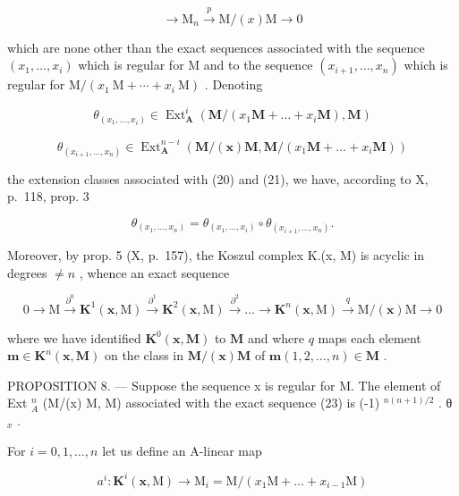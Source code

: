 \[
\longrightarrow \mathrm{M} _ {n} \stackrel {p} {\longrightarrow} \mathrm{M} / (x) \mathrm{M} \longrightarrow 0
\]

which are none other than the exact sequences associated with the sequence \((x_{1}, \ldots, x_{i})\) which is regular for M and to the sequence \((x_{i+1}, \ldots, x_{n})\) which is regular for \(\mathrm{M}/(x_{1} \mathrm{~M} + \cdots + x_{i} \mathrm{~M})\) . Denoting

\[
\theta_ {(x _ {1}, \dots , x _ {i})} \in \operatorname{Ext} _ {\mathbf {A}} ^ {i} (\mathbf {M} / (x _ {1} \mathbf {M} + \dots + x _ {i} \mathbf {M}), \mathbf {M})
\]

\[
\theta_ {(x _ {i + 1}, \dots , x _ {n})} \in \operatorname{Ext} _ {\mathbf {A}} ^ {n - i} (\mathbf {M} / (\boldsymbol {x}) \mathbf {M}, \mathbf {M} / (x _ {1} \mathbf {M} + \dots + x _ {i} \mathbf {M}))
\]

the extension classes associated with (20) and (21), we have, according to X, p.~118, prop. 3

\[
\theta_ {(x _ {1}, \dots , x _ {n})} = \theta_ {(x _ {1}, \dots , x _ {i})} \circ \theta_ {(x _ {i + 1}, \dots , x _ {n})}.\tag{22}
\]

Moreover, by prop. 5 (X, p.~157), the Koszul complex K.(x, M) is acyclic in degrees \(\neq n\) , whence an exact sequence

\[
0 \longrightarrow \mathrm{M} \xrightarrow {\partial^ {0}} \mathbf {K} ^ {1} (\boldsymbol {x}, \mathrm{M}) \xrightarrow {\partial^ {1}} \mathbf {K} ^ {2} (\boldsymbol {x}, \mathrm{M}) \xrightarrow {\partial^ {2}} \dots \longrightarrow \mathbf {K} ^ {n} (\boldsymbol {x}, \mathrm{M}) \xrightarrow {q} \mathrm{M} / (\boldsymbol {x}) \mathrm{M} \longrightarrow 0\tag{23}
\]

where we have identified \(\mathbf{K}^{0}(\boldsymbol{x},\mathbf{M})\) to \(\mathbf{M}\) and where \(q\) maps each element \(\boldsymbol{m}\in\mathbf{K}^{n}(\boldsymbol{x},\mathbf{M})\) on the class in \(\mathbf{M}/(\boldsymbol{x})\mathbf{M}\) of \(\boldsymbol{m}(1,2,\ldots,n)\in\mathbf{M}\) .

PROPOSITION 8. --- Suppose the sequence x is regular for M. The element of Ext \(_{A}^{n}\) (M/(x) M, M) associated with the exact sequence (23) is (-1) \(^{n(n+1)/2}\) . θ \(_{x}\) .

For \(i = 0,1,\dots,n\) let us define an A-linear map

\[
a ^ {i}: \mathbf {K} ^ {i} (\boldsymbol {x}, \mathrm{M}) \rightarrow \mathrm{M} _ {i} = \mathrm{M} / (x _ {1} \mathrm{M} + \dots + x _ {i - 1} \mathrm{M})
\]

